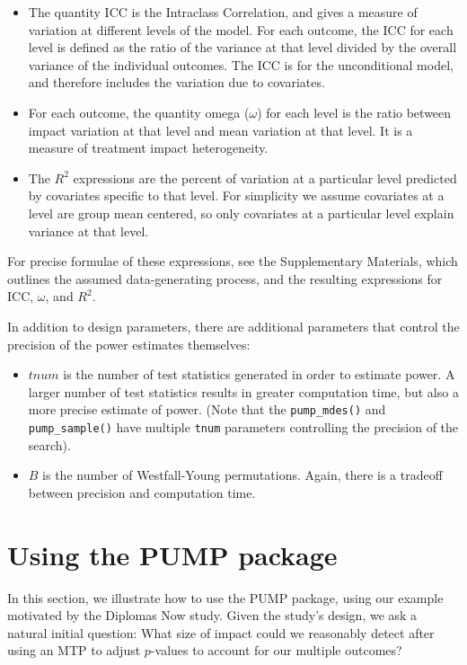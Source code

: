 \documentclass[
]{article}
\providecommand{\tightlist}{%
  \setlength{\itemsep}{0pt}\setlength{\parskip}{0pt}}
\begin{document}
\begin{itemize}
\item
  The quantity \(\text{ICC}\) is the Intraclass Correlation, and gives a
  measure of variation at different levels of the model. For each
  outcome, the ICC for each level is defined as the ratio of the
  variance at that level divided by the overall variance of the
  individual outcomes. The ICC is for the unconditional model, and
  therefore includes the variation due to covariates.
\item
  For each outcome, the quantity omega (\(\omega\)) for each level is
  the ratio between impact variation at that level and mean variation at
  that level. It is a measure of treatment impact heterogeneity.
\item
  The \(R^2\) expressions are the percent of variation at a particular
  level predicted by covariates specific to that level. For simplicity
  we assume covariates at a level are group mean centered, so only
  covariates at a particular level explain variance at that level.
\end{itemize}

For precise formulae of these expressions, see the Supplementary
Materials, which outlines the assumed data-generating process, and the
resulting expressions for \(\text{ICC}\), \(\omega\), and \(R^2\).

In addition to design parameters, there are additional parameters that
control the precision of the power estimates themselves:

\begin{itemize}
\tightlist
\item
  \(tnum\) is the number of test statistics generated in order to
  estimate power. A larger number of test statistics results in greater
  computation time, but also a more precise estimate of power. (Note
  that the \texttt{pump\_mdes()} and \texttt{pump\_sample()} have
  multiple \texttt{tnum} parameters controlling the precision of the
  search).
\item
  \(B\) is the number of Westfall-Young permutations. Again, there is a
  tradeoff between precision and computation time.
\end{itemize}

\section{Using the PUMP package}
\label{sec:vignette}

In this section, we illustrate how to use the PUMP package, using our
example motivated by the Diplomas Now study. Given the study's design,
we ask a natural initial question: What size of impact could we
reasonably detect after using an MTP to adjust \(p\)-values to account
for our multiple outcomes?
\end{document}
